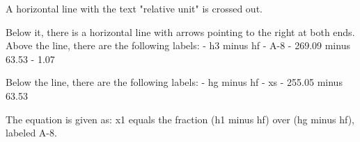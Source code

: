 A horizontal line with the text "relative unit" is crossed out.

Below it, there is a horizontal line with arrows pointing to the right at both ends. Above the line, there are the following labels:
- h3 minus hf
- A-8
- 269.09 minus 63.53
- 1.07

Below the line, there are the following labels:
- hg minus hf
- xs
- 255.05 minus 63.53

The equation is given as:
x1 equals the fraction (h1 minus hf) over (hg minus hf), labeled A-8.